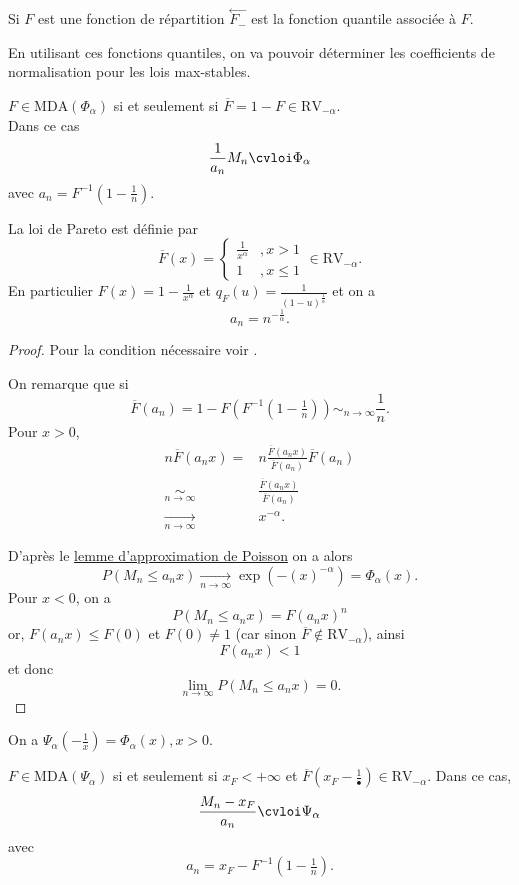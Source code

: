 \documentclass[10p,a4paper,reqno,titlepage]{report}
\begin{document}
\begin{rem}
	Si $F$ est une fonction de répartition $ \overset{\leftarrow}{F_- }$ est la fonction quantile associée à $F$.
\end{rem}
En utilisant ces fonctions quantiles, on va pouvoir déterminer les coefficients de normalisation pour les lois max-stables.
\begin{prop}
	$F \in \mathrm{MDA}(\Phi_\alpha)$ si et seulement si $ \overline{F}=1-F \in\mathrm{RV}_{-\alpha}$.\\
	Dans ce cas 
	$$ \frac{1}{a_n} M_n \cvloi \Phi_\alpha$$
	avec $a_n= F^{-1} (1-\tfrac1n ).$
\end{prop}
\begin{rem}
La loi de Pareto est définie par 
$$ \overline{F}(x)= \left\{\begin{array}{ll} \frac{1}{x^\alpha}&, x > 1\\ 1&, x \leq 1 
	\end{array}\right. \in \mathrm{RV}_{-\alpha}.$$
En particulier $F(x)= 1 -\frac{1}{x^\alpha}$ et $q_F (u)= \frac{1}{(1-u)^\tfrac{1}{\alpha}}$ et on a 
$$ a_n = n^{-\tfrac{1}{\alpha}}.$$
\end{rem}
\begin{proof}
	Pour la condition nécessaire voir \cite[pp 55-57]{Resnick_1987} .
	
	On remarque que si 
	$$ \overline{F}(a_n) = 1 - F (F^{-1} (1-\tfrac1n )) \sim_{n\to \infty} \frac{1}{n}.$$
	Pour $x>0$, 
	\begin{align*}
		n \overline{F}(a_n x) = & n \frac{\overline{F}(a_n x )}{\overline{F}(a_n)}\overline{F}(a_n)\\
		\underset{n\to \infty}{\sim} & \frac{\overline{F}(a_n x )}{\overline{F}(a_n)}\\
		\underset{n\to\infty}{\longrightarrow}  & x^{-\alpha}.
	\end{align*}

D'après le \hyperref[lemmepoisson]{lemme d'approximation de Poisson} on a alors 
$$ P(M_n \leq a_n x ) \underset{n\to\infty}{\longrightarrow} \exp(-(x)^{-\alpha}) =\Phi_\alpha(x).$$
Pour $x< 0$, on a 
$$P (M_n \leq a_n x )= F(a_n x)^n$$
or, $F(a_n x ) \leq F(0)$ et $F (0) \neq 1$ (car sinon $\overline{F} \notin \mathrm{RV}_{-\alpha}$), ainsi
$$ F (a_n x ) < 1$$
et donc 
$$ \lim_{n\to\infty} P(M_n \leq a_n x ) = 0.$$
\end{proof}
\begin{rem}
	On a $\Psi_\alpha (-\tfrac1x) = \Phi_\alpha (x), x >0.$
\end{rem}
\begin{prop}
	$F \in \mathrm{MDA}(\Psi_\alpha)$ si et seulement si $x_F < + \infty$ et $\overline{F}(x_F - \frac{1}{\bullet}) \in\mathrm{RV}_{-\alpha}$. Dans ce cas,
	$$ \frac{M_n - x_F}{a_n} \cvloi \Psi_\alpha$$
	avec 
	$$a_n = x_F - F^{-1} (1- \tfrac1n).$$
\end{prop}
\end{document}
